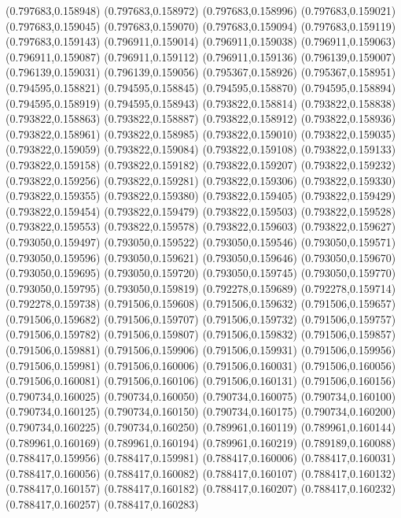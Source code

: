 (0.797683,0.158948)
(0.797683,0.158972)
(0.797683,0.158996)
(0.797683,0.159021)
(0.797683,0.159045)
(0.797683,0.159070)
(0.797683,0.159094)
(0.797683,0.159119)
(0.797683,0.159143)
(0.796911,0.159014)
(0.796911,0.159038)
(0.796911,0.159063)
(0.796911,0.159087)
(0.796911,0.159112)
(0.796911,0.159136)
(0.796139,0.159007)
(0.796139,0.159031)
(0.796139,0.159056)
(0.795367,0.158926)
(0.795367,0.158951)
(0.794595,0.158821)
(0.794595,0.158845)
(0.794595,0.158870)
(0.794595,0.158894)
(0.794595,0.158919)
(0.794595,0.158943)
(0.793822,0.158814)
(0.793822,0.158838)
(0.793822,0.158863)
(0.793822,0.158887)
(0.793822,0.158912)
(0.793822,0.158936)
(0.793822,0.158961)
(0.793822,0.158985)
(0.793822,0.159010)
(0.793822,0.159035)
(0.793822,0.159059)
(0.793822,0.159084)
(0.793822,0.159108)
(0.793822,0.159133)
(0.793822,0.159158)
(0.793822,0.159182)
(0.793822,0.159207)
(0.793822,0.159232)
(0.793822,0.159256)
(0.793822,0.159281)
(0.793822,0.159306)
(0.793822,0.159330)
(0.793822,0.159355)
(0.793822,0.159380)
(0.793822,0.159405)
(0.793822,0.159429)
(0.793822,0.159454)
(0.793822,0.159479)
(0.793822,0.159503)
(0.793822,0.159528)
(0.793822,0.159553)
(0.793822,0.159578)
(0.793822,0.159603)
(0.793822,0.159627)
(0.793050,0.159497)
(0.793050,0.159522)
(0.793050,0.159546)
(0.793050,0.159571)
(0.793050,0.159596)
(0.793050,0.159621)
(0.793050,0.159646)
(0.793050,0.159670)
(0.793050,0.159695)
(0.793050,0.159720)
(0.793050,0.159745)
(0.793050,0.159770)
(0.793050,0.159795)
(0.793050,0.159819)
(0.792278,0.159689)
(0.792278,0.159714)
(0.792278,0.159738)
(0.791506,0.159608)
(0.791506,0.159632)
(0.791506,0.159657)
(0.791506,0.159682)
(0.791506,0.159707)
(0.791506,0.159732)
(0.791506,0.159757)
(0.791506,0.159782)
(0.791506,0.159807)
(0.791506,0.159832)
(0.791506,0.159857)
(0.791506,0.159881)
(0.791506,0.159906)
(0.791506,0.159931)
(0.791506,0.159956)
(0.791506,0.159981)
(0.791506,0.160006)
(0.791506,0.160031)
(0.791506,0.160056)
(0.791506,0.160081)
(0.791506,0.160106)
(0.791506,0.160131)
(0.791506,0.160156)
(0.790734,0.160025)
(0.790734,0.160050)
(0.790734,0.160075)
(0.790734,0.160100)
(0.790734,0.160125)
(0.790734,0.160150)
(0.790734,0.160175)
(0.790734,0.160200)
(0.790734,0.160225)
(0.790734,0.160250)
(0.789961,0.160119)
(0.789961,0.160144)
(0.789961,0.160169)
(0.789961,0.160194)
(0.789961,0.160219)
(0.789189,0.160088)
(0.788417,0.159956)
(0.788417,0.159981)
(0.788417,0.160006)
(0.788417,0.160031)
(0.788417,0.160056)
(0.788417,0.160082)
(0.788417,0.160107)
(0.788417,0.160132)
(0.788417,0.160157)
(0.788417,0.160182)
(0.788417,0.160207)
(0.788417,0.160232)
(0.788417,0.160257)
(0.788417,0.160283)
